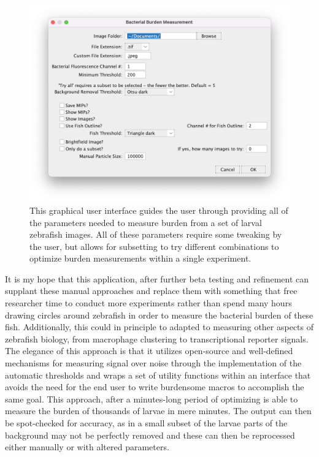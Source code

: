 \begin{figure}
\centering
\includegraphics[width=\textwidth]{images/burden_gui.png}
\caption[GUI for measuring bacterial burden from larval zebrafish]{This graphical user interface guides the user through providing all of the parameters needed to measure burden from a set of larval zebrafish images. All of these parameters require some tweaking by the user, but allows for subsetting to try different combinations to optimize burden measurements within a single experiment.}
\label{figure:burdengui}
\end{figure}

It is my hope that this application, after further beta testing and refinement can supplant these manual approaches and replace them with something that free researcher time to conduct more experiments rather than spend many hours drawing circles around zebrafish in order to measure the bacterial burden of these fish. Additionally, this could in principle to adapted to measuring other aspects of zebrafish biology, from macrophage clustering to transcriptional reporter signals. The elegance of this approach is that it utilizes open\hyp{}source and well\hyp{}defined mechanisms for measuring signal over noise through the implementation of the automatic thresholds and wraps a set of utility functions within an interface that avoids the need for the end user to write burdensome macros to accomplish the same goal. This approach, after a minutes\hyp{}long period of optimizing is able to measure the burden of thousands of larvae in mere minutes. The output can then be spot\hyp{}checked for accuracy, as in a small subset of the larvae parts of the background may not be perfectly removed and these can then be reprocessed either manually or with altered parameters. 


